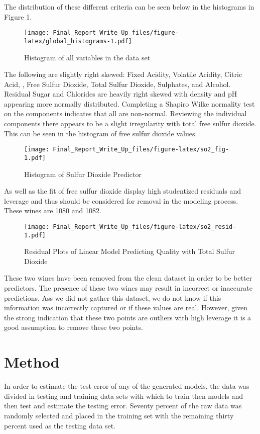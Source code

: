 \documentclass[]{article}
\begin{document}
The distribution of these different criteria can be seen below in the
histograms in Figure 1.

\begin{figure}[H]
\centering
\texttt{[image: Final\_Report\_Write\_Up\_files/figure-latex/global\_histograms-1.pdf]}
\caption{Histogram of all variables in the data set}
\end{figure}

The following are slightly right skewed: Fixed Acidity, Volatile
Acidity, Citric Acid, , Free Sulfur Dioxide, Total Sulfur Dioxide,
Sulphates, and Alcohol. Residual Sugar and Chlorides are heavily right
skewed with density and pH appearing more normally distributed.
Completing a Shapiro Wilke normality test on the components indicates
that all are non-normal. Reviewing the individual components there
appears to be a slight irregularity with total free sulfur dioxide. This
can be seen in the histogram of free sulfur dioxide values.

\begin{figure}[H]
\centering
\texttt{[image: Final\_Report\_Write\_Up\_files/figure-latex/so2\_fig-1.pdf]}
\caption{Histogram of Sulfur Dioxide Predictor}
\end{figure}

As well as the fit of free sulfur dioxide display high studentized
residuals and leverage and thus should be considered for removal in the
modeling process. These wines are 1080 and 1082.

\begin{figure}[htbp]
\centering
\texttt{[image: Final\_Report\_Write\_Up\_files/figure-latex/so2\_resid-1.pdf]}
\caption{Residual Plots of Linear Model Predicting Quality with Total
Sulfur Dioxide}
\end{figure}

These two wines have been removed from the clean dataset in order to be
better predictors. The presence of these two wines may result in
incorrect or inaccurate predictions. Ass we did not gather this dataset,
we do not know if this information was incorrectly captured or if these
values are real. However, given the strong indication that these two
points are outliers with high leverage it is a good assumption to remove
these two points.

\section{Method}\label{method}

In order to estimate the test error of any of the generated models, the
data was divided in testing and training data sets with which to train
then models and then test and estimate the testing error. Seventy
percent of the raw data was randomly selected and placed in the training
set with the remaining thirty percent used as the testing data set.
\end{document}
